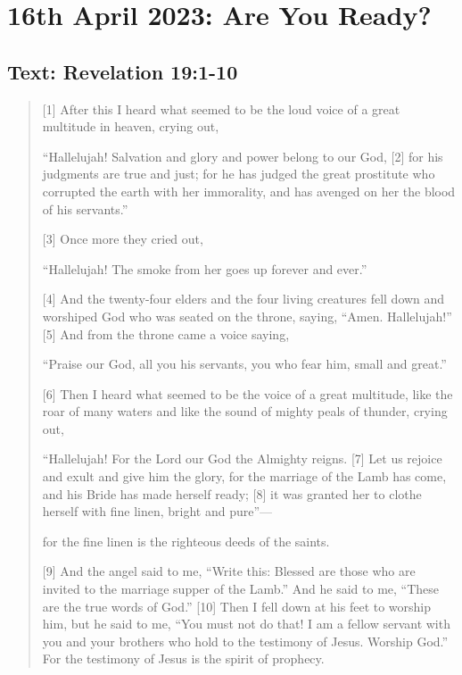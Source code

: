 \setcounter{figure}{0}

\section{16th April 2023: Are You Ready?}
\subsection*{Text: Revelation 19:1-10}
  \begin{quote}
    [1] After this I heard what seemed to be the loud voice of a great multitude in heaven, crying out,

    “Hallelujah!
    Salvation and glory and power belong to our God,
    [2]     for his judgments are true and just;
    for he has judged the great prostitute
        who corrupted the earth with her immorality,
    and has avenged on her the blood of his servants.”


      [3] Once more they cried out,

    “Hallelujah!
    The smoke from her goes up forever and ever.”


    [4] And the twenty-four elders and the four living creatures fell down and worshiped God who was seated on the throne, saying, “Amen. Hallelujah!” [5] And from the throne came a voice saying,

    “Praise our God,
        all you his servants,
    you who fear him,
        small and great.”


    [6] Then I heard what seemed to be the voice of a great multitude, like the roar of many waters and like the sound of mighty peals of thunder, crying out,

    “Hallelujah!
    For the Lord our God
        the Almighty reigns.
    [7] Let us rejoice and exult
        and give him the glory,
    for the marriage of the Lamb has come,
        and his Bride has made herself ready;
    [8] it was granted her to clothe herself
        with fine linen, bright and pure”—


    for the fine linen is the righteous deeds of the saints.

    [9] And the angel said to me, “Write this: Blessed are those who are invited to the marriage supper of the Lamb.” And he said to me, “These are the true words of God.” [10] Then I fell down at his feet to worship him, but he said to me, “You must not do that! I am a fellow servant with you and your brothers who hold to the testimony of Jesus. Worship God.” For the testimony of Jesus is the spirit of prophecy.
  \end{quote}
